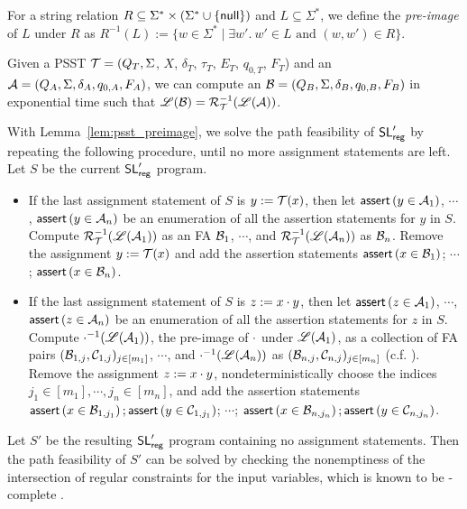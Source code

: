 \begin{definition}
For a string relation $R \subseteq \Sigma^* \times (\Sigma^* \cup \{\mathsf{null}\})$ and $L \subseteq \Sigma^*$, we define the \emph{pre-image} of $L$ under $R$ as $R^{-1}(L):=\{w \in \Sigma^* \mid \exists w'.\ w' \in L \mbox{ and } (w, w') \in R\}$. 
\end{definition}
 
\begin{lemma}
  \label{lem:psst_preimage}
  Given a PSST $\mathcal{T} = (Q_T, \Sigma$, $X$, $\delta_T$, $\tau_T$, $E_T$,  $q_{0, T}$, $F_T$) and an \FA{} $\mathcal{A}
  = (Q_A, \Sigma, \delta_A, q_{0, A}, F_A)$, we can compute an \FA{} $\mathcal{B} = (Q_B,
  \Sigma, \delta_B, q_{0, B}, F_B)$ in exponential time  such that $\mathscr{L}(\mathcal{B}) = \mathcal{R}^{-1}_{\mathcal{T}}(\mathscr{L}(\mathcal{A}))$.
\end{lemma}

With Lemma~\ref{lem:psst_preimage}, we  solve the path feasibility of $\mathsf{SL}'_{\sf reg}$ by repeating the following procedure, until no more assignment statements are left. Let $S$ be the current $\mathsf{SL}'_{\sf reg}$ program.
\begin{itemize}
\item If the last assignment statement of $S$ is $y:=\mathcal{T}(x)$, then let $\textsf{assert}\left(y \in \mathcal{A}_1\right)$, $\cdots$, $\textsf{assert}\left(y \in \mathcal{A}_n\right)$ be an enumeration of all the assertion statements for $y$ in $S$. Compute $\mathcal{R}^{-1}_{\mathcal{T}}(\mathscr{L}(\mathcal{A}_1))$ as an FA $\mathcal{B}_1$, $\cdots$, and $\mathcal{R}^{-1}_{\mathcal{T}}(\mathscr{L}(\mathcal{A}_n))$ as $\mathcal{B}_n$. Remove  the assignment  $y:=\mathcal{T}(x)$ and add the assertion statements $\textsf{assert}\left(x \in \mathcal{B}_1\right)$; $\cdots$; $\textsf{assert}\left(x \in \mathcal{B}_n\right)$. 
%
\item If the last assignment statement of $S$ is $z:=x \cdot y$, then let $\textsf{assert}\left(z \in \mathcal{A}_1\right)$, $\cdots$, $\textsf{assert}\left(z \in \mathcal{A}_n\right)$ be an enumeration of all the assertion statements for $z$ in $S$. Compute $\cdot^{-1}(\mathscr{L}(\mathcal{A}_1))$, the pre-image of $\cdot$ under $\mathscr{L}(\mathcal{A}_1)$, as a collection of FA pairs $(\mathcal{B}_{1,j}, \mathcal{C}_{1,j})_{j \in [m_1]}$, $\cdots$, and $\cdot^{-1}(\mathscr{L}(\mathcal{A}_n))$ as $(\mathcal{B}_{n, j}, \mathcal{C}_{n,j})_{j \in [m_n]}$ (c.f. \cite{CHL+19}). Remove the assignment $z:=x \cdot y$, nondeterministically choose the indices $j_1 \in [m_1], \cdots, j_n \in [m_n]$, and add the assertion statements $\textsf{assert}\left(x \in \mathcal{B}_{1,j_1}\right); \textsf{assert}\left(y \in \mathcal{C}_{1, j_1}\right)$; $\cdots$; $\textsf{assert}\left(x \in \mathcal{B}_{n,j_n}\right); \textsf{assert}\left(y \in \mathcal{C}_{n, j_n}\right)$. 
\end{itemize}
Let $S'$ be the resulting $\mathsf{SL}'_{\sf reg}$ program containing no assignment statements. Then the path feasibility of $S'$ can be solved by checking the nonemptiness of the intersection of regular constraints for the input variables, which is known to be \pspace-complete \cite{Kozen77}.

